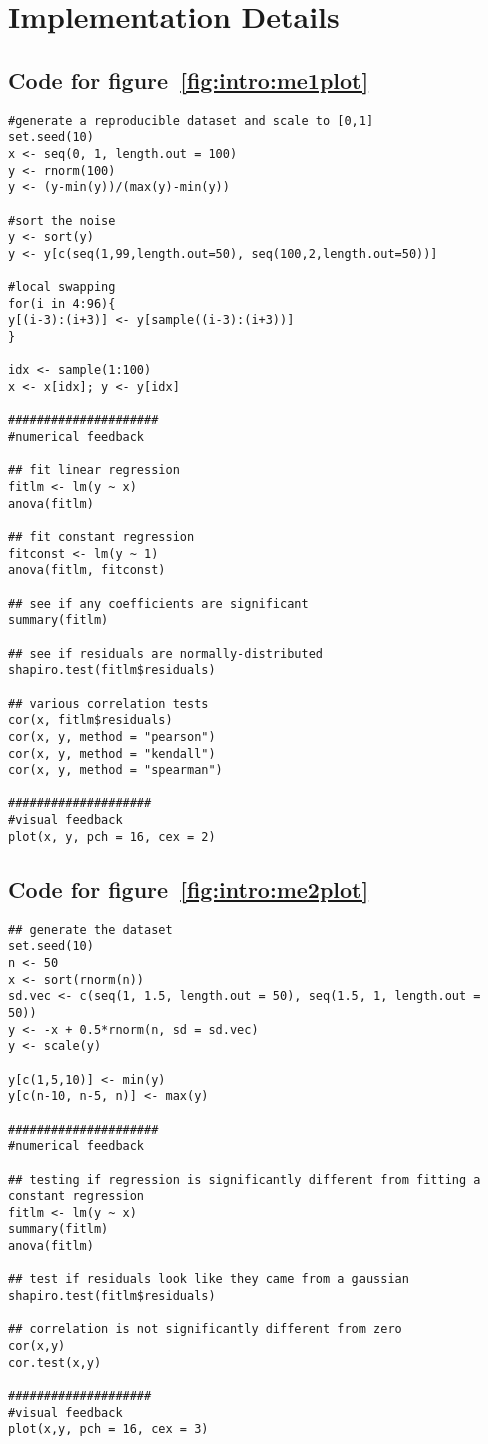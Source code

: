 \chapter{Implementation Details\label{ch:implementation}}

\lstset{basicstyle=\ttfamily,xleftmargin=0.5cm,breaklines=true}


\section{Code for figure~\ref{fig:intro:me1plot}}
\label{sec:appendicies:me1plot}
{
\begin{lstlisting}
#generate a reproducible dataset and scale to [0,1]
set.seed(10)
x <- seq(0, 1, length.out = 100)
y <- rnorm(100)
y <- (y-min(y))/(max(y)-min(y))

#sort the noise
y <- sort(y)
y <- y[c(seq(1,99,length.out=50), seq(100,2,length.out=50))]

#local swapping
for(i in 4:96){
y[(i-3):(i+3)] <- y[sample((i-3):(i+3))]
}

idx <- sample(1:100)
x <- x[idx]; y <- y[idx]

#####################
#numerical feedback

## fit linear regression
fitlm <- lm(y ~ x)
anova(fitlm)

## fit constant regression
fitconst <- lm(y ~ 1)
anova(fitlm, fitconst)

## see if any coefficients are significant
summary(fitlm)

## see if residuals are normally-distributed
shapiro.test(fitlm$residuals)

## various correlation tests
cor(x, fitlm$residuals)
cor(x, y, method = "pearson")
cor(x, y, method = "kendall")
cor(x, y, method = "spearman")

####################
#visual feedback
plot(x, y, pch = 16, cex = 2)
\end{lstlisting}
}


\section{Code for figure~\ref{fig:intro:me2plot}}
\label{sec:appendicies:me2plot}
{
\begin{lstlisting}
## generate the dataset
set.seed(10)
n <- 50
x <- sort(rnorm(n))
sd.vec <- c(seq(1, 1.5, length.out = 50), seq(1.5, 1, length.out = 50))
y <- -x + 0.5*rnorm(n, sd = sd.vec)
y <- scale(y)

y[c(1,5,10)] <- min(y)
y[c(n-10, n-5, n)] <- max(y)

#####################
#numerical feedback

## testing if regression is significantly different from fitting a constant regression
fitlm <- lm(y ~ x)
summary(fitlm)
anova(fitlm)

## test if residuals look like they came from a gaussian
shapiro.test(fitlm$residuals) 

## correlation is not significantly different from zero
cor(x,y)
cor.test(x,y)

####################
#visual feedback
plot(x,y, pch = 16, cex = 3)
\end{lstlisting}
}


